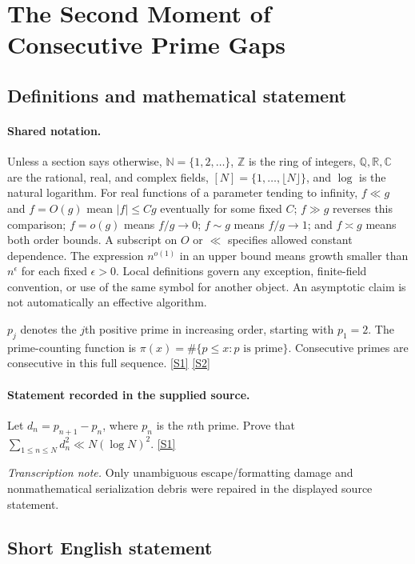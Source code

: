 \documentclass[11pt,a4paper]{article}
\newcommand{\N}{\mathbb{N}}
\newcommand{\Z}{\mathbb{Z}}
\newcommand{\Q}{\mathbb{Q}}
\newcommand{\R}{\mathbb{R}}
\newcommand{\C}{\mathbb{C}}
\newcommand{\sref}[2]{\hyperlink{source:#1:#2}{[S#2]}}
\begin{document}
\section{The Second Moment of Consecutive Prime Gaps}\label{statement}


\subsection{Definitions and mathematical statement}

\paragraph{Shared notation.}Unless a section says otherwise, $\N=\{1,2,\ldots\}$,
$\Z$ is the ring of integers, $\Q,\R,\C$ are the rational, real, and complex
fields, $[N]=\{1,\ldots,\lfloor N\rfloor\}$, and $\log$ is the natural
logarithm. For real functions of a parameter tending to infinity,
$f\ll g$ and $f=O(g)$ mean $|f|\leq Cg$ eventually for some fixed $C$;
$f\gg g$ reverses this comparison; $f=o(g)$ means $f/g\to0$;
$f\sim g$ means $f/g\to1$; and $f\asymp g$ means both order bounds.
A subscript on $O$ or $\ll$ specifies allowed constant dependence.
The expression $n^{o(1)}$ in an upper bound means growth smaller than
$n^\epsilon$ for each fixed $\epsilon>0$. Local definitions govern any
exception, finite-field convention, or use of the same symbol for another
object. An asymptotic claim is not automatically an effective algorithm.



$p_j$ denotes the $j$th positive prime in increasing order, starting with $p_1=2$. The prime-counting function is $\pi(x)=\#\{p\leq x:p\text{ is prime}\}$. Consecutive primes are consecutive in this full sequence. \sref{statement}{1} \sref{statement}{2}

\paragraph{Statement recorded in the supplied source.}
Let $d_n=p_{n+1}-p_n$, where $p_n$ is the $n$th prime. Prove that $ \sum_{1\leq n\leq N}d_n^2 \ll N(\log N)^2. $ \sref{statement}{1}

{\small\emph{Transcription note.} Only unambiguous escape/formatting damage and nonmathematical serialization debris were repaired in the displayed source statement.}

\subsection{Short English statement}
\end{document}
